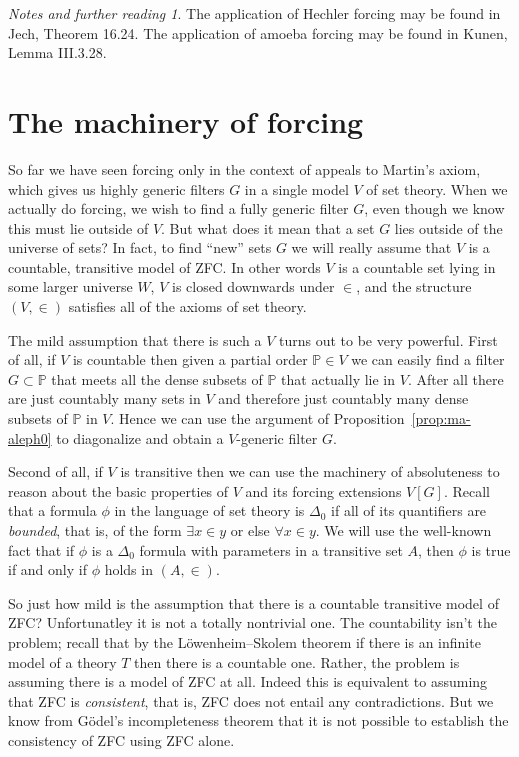 \documentclass[11pt,oneside]{amsbook}
\newcommand{\PP}{\mathbb P}
\theoremstyle{definition}
\theoremstyle{plain}
\theoremstyle{definition}
\theoremstyle{remark}
\newtheorem*{notes}{Notes and further reading}
\numberwithin{equation}{section}
\numberwithin{figure}{section}
\begin{document}
\begin{notes}
  The application of Hechler forcing may be found in Jech, Theorem 16.24. The application of amoeba forcing may be found in Kunen, Lemma III.3.28.
\end{notes}


\newpage
\section{The machinery of forcing}

So far we have seen forcing only in the context of appeals to Martin's axiom, which gives us highly generic filters $G$ in a single model $V$ of set theory. When we actually do forcing, we wish to find a fully generic filter $G$, even though we know this must lie outside of $V$. But what does it mean that a set $G$ lies outside of the universe of sets? In fact, to find ``new'' sets $G$ we will really assume that $V$ is a countable, transitive model of ZFC. In other words $V$ is a countable set lying in some larger universe $W$, $V$ is closed downwards under $\in$, and the structure $(V,\in)$ satisfies all of the axioms of set theory.

The mild assumption that there is such a $V$ turns out to be very powerful. First of all, if $V$ is countable then given a partial order $\PP\in V$ we can easily find a filter $G\subset\PP$ that meets all the dense subsets of $\PP$ that actually lie in $V$. After all there are just countably many sets in $V$ and therefore just countably many dense subsets of $\mathbb P$ in $V$. Hence we can use the argument of Proposition~\ref{prop:ma-aleph0} to diagonalize and obtain a $V$-generic filter $G$.

Second of all, if $V$ is transitive then we can use the machinery of absoluteness to reason about the basic properties of $V$ and its forcing extensions $V[G]$. Recall that a formula $\phi$ in the language of set theory is $\Delta_0$ if all of its quantifiers are \emph{bounded}, that is, of the form $\exists x\in y$ or else $\forall x\in y$. We will use the well-known fact that if $\phi$ is a $\Delta_0$ formula with parameters in a transitive set $A$, then $\phi$ is true if and only if $\phi$ holds in $(A,\in)$.

So just how mild is the assumption that there is a countable transitive model of ZFC? Unfortunatley it is not a totally nontrivial one. The countability isn't the problem; recall that by the L\"owenheim--Skolem theorem if there is an infinite model of a theory $T$ then there is a countable one. Rather, the problem is assuming there is a model of ZFC at all. Indeed this is equivalent to assuming that ZFC is \emph{consistent}, that is, ZFC does not entail any contradictions. But we know from G\"odel's incompleteness theorem that it is not possible to establish the consistency of ZFC using ZFC alone.
\end{document}
